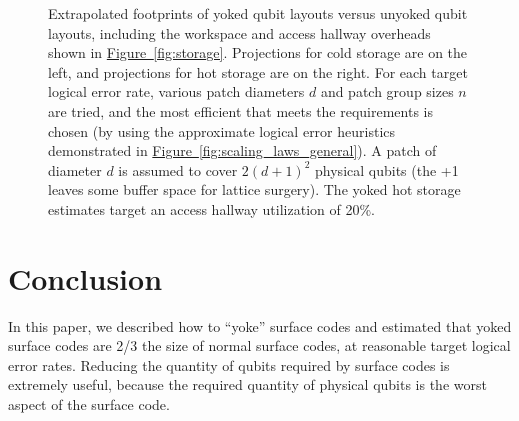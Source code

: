 \documentclass[onecolumn,unpublished,a4paper]{quantumarticle}
\theoremstyle{definition}
\theoremstyle{definition}
\theoremstyle{definition}
\newcommand{\fig}[1]{\hyperref[fig:#1]{Figure~\ref*{fig:#1}}}
\begin{document}
\begin{figure}[h]
{    }
    \caption{
        Extrapolated footprints of yoked qubit layouts versus unyoked qubit layouts, including the workspace and access hallway overheads shown in \fig{storage}.
        Projections for cold storage are on the left, and projections for hot storage are on the right.
        For each target logical error rate, various patch diameters $d$ and patch group sizes $n$ are tried, and the most efficient that meets the requirements is chosen (by using the approximate logical error heuristics demonstrated in \fig{scaling_laws_general}).
        A patch of diameter $d$ is assumed to cover $2(d+1)^2$ physical qubits (the +1 leaves some buffer space for lattice surgery).
        The yoked hot storage estimates target an access hallway utilization of 20\%.
    }
    \label{fig:footprint}
\end{figure}


\section{Conclusion}
\label{sec:conclusion}








In this paper, we described how to ``yoke'' surface codes and estimated that yoked surface codes are 2/3 the size of normal surface codes, at reasonable target logical error rates.
Reducing the quantity of qubits required by surface codes is extremely useful, because the required quantity of physical qubits is the worst aspect of the surface code.
\end{document}
